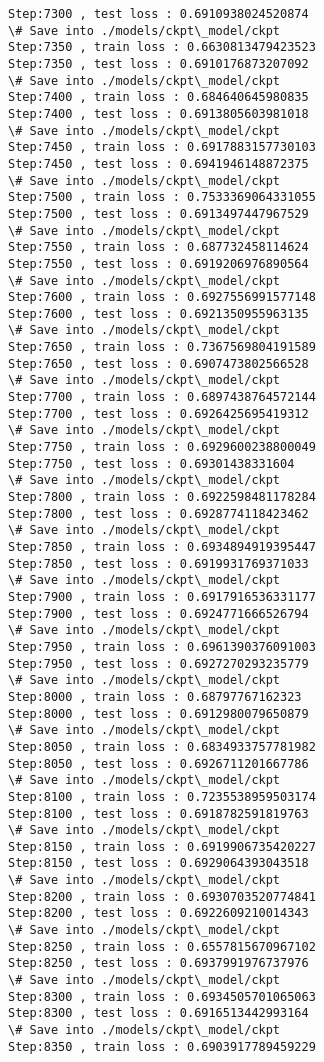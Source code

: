 \documentclass[11pt]{article}
\begin{document}
\begin{Verbatim}[commandchars=\\\{\}]
Step:7300 , test loss : 0.6910938024520874
\# Save into ./models/ckpt\_model/ckpt
Step:7350 , train loss : 0.6630813479423523
Step:7350 , test loss : 0.6910176873207092
\# Save into ./models/ckpt\_model/ckpt
Step:7400 , train loss : 0.684640645980835
Step:7400 , test loss : 0.6913805603981018
\# Save into ./models/ckpt\_model/ckpt
Step:7450 , train loss : 0.6917883157730103
Step:7450 , test loss : 0.6941946148872375
\# Save into ./models/ckpt\_model/ckpt
Step:7500 , train loss : 0.7533369064331055
Step:7500 , test loss : 0.6913497447967529
\# Save into ./models/ckpt\_model/ckpt
Step:7550 , train loss : 0.687732458114624
Step:7550 , test loss : 0.6919206976890564
\# Save into ./models/ckpt\_model/ckpt
Step:7600 , train loss : 0.6927556991577148
Step:7600 , test loss : 0.6921350955963135
\# Save into ./models/ckpt\_model/ckpt
Step:7650 , train loss : 0.7367569804191589
Step:7650 , test loss : 0.6907473802566528
\# Save into ./models/ckpt\_model/ckpt
Step:7700 , train loss : 0.6897438764572144
Step:7700 , test loss : 0.6926425695419312
\# Save into ./models/ckpt\_model/ckpt
Step:7750 , train loss : 0.6929600238800049
Step:7750 , test loss : 0.69301438331604
\# Save into ./models/ckpt\_model/ckpt
Step:7800 , train loss : 0.6922598481178284
Step:7800 , test loss : 0.6928774118423462
\# Save into ./models/ckpt\_model/ckpt
Step:7850 , train loss : 0.6934894919395447
Step:7850 , test loss : 0.6919931769371033
\# Save into ./models/ckpt\_model/ckpt
Step:7900 , train loss : 0.6917916536331177
Step:7900 , test loss : 0.6924771666526794
\# Save into ./models/ckpt\_model/ckpt
Step:7950 , train loss : 0.6961390376091003
Step:7950 , test loss : 0.6927270293235779
\# Save into ./models/ckpt\_model/ckpt
Step:8000 , train loss : 0.68797767162323
Step:8000 , test loss : 0.6912980079650879
\# Save into ./models/ckpt\_model/ckpt
Step:8050 , train loss : 0.6834933757781982
Step:8050 , test loss : 0.6926711201667786
\# Save into ./models/ckpt\_model/ckpt
Step:8100 , train loss : 0.7235538959503174
Step:8100 , test loss : 0.6918782591819763
\# Save into ./models/ckpt\_model/ckpt
Step:8150 , train loss : 0.6919906735420227
Step:8150 , test loss : 0.6929064393043518
\# Save into ./models/ckpt\_model/ckpt
Step:8200 , train loss : 0.6930703520774841
Step:8200 , test loss : 0.6922609210014343
\# Save into ./models/ckpt\_model/ckpt
Step:8250 , train loss : 0.6557815670967102
Step:8250 , test loss : 0.6937991976737976
\# Save into ./models/ckpt\_model/ckpt
Step:8300 , train loss : 0.6934505701065063
Step:8300 , test loss : 0.6916513442993164
\# Save into ./models/ckpt\_model/ckpt
Step:8350 , train loss : 0.6903917789459229

\end{Verbatim}
\end{document}
